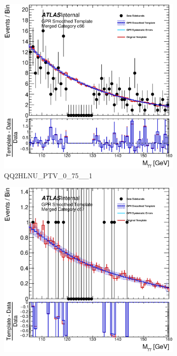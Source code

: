 \begin{figure}
\begin{center}
\begin{subfigure}[T]{0.49\linewidth}
	\centering
	\includegraphics[width=\linewidth]{figures/background/gpr/coupCatTemplates/GPR_Smoothed_Plot_hmgg_c66.eps}
	\caption{QQ2HLNU\_PTV\_0\_75\_\_1}
\end{subfigure}
\begin{subfigure}[T]{0.49\linewidth}
	\centering
	\includegraphics[width=\linewidth]{figures/background/gpr/coupCatTemplates/GPR_Smoothed_Plot_hmgg_c67.eps}

\end{subfigure}
\end{center}
\end{figure}
